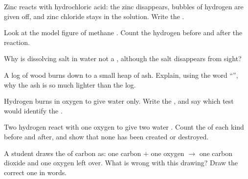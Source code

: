 \begin{exercise}[$\star\star$]\label{exo:g7:chemical-reactions:6}
Zinc reacts with hydrochloric acid: the zinc disappears, bubbles of
hydrogen are given off, and zinc chloride stays in the solution. Write
the .
\end{exercise}

\begin{exercise}[$\star\star$]\label{exo:g7:chemical-reactions:7}
Look at the model figure of methane . Count the hydrogen 
before and after the reaction.
\end{exercise}

\begin{exercise}[$\star\star$]\label{exo:g7:chemical-reactions:8}
Why is dissolving salt in water not a , although the
salt disappears from sight?
\end{exercise}

\begin{exercise}[$\star\star$]\label{exo:g7:chemical-reactions:9}
A log of wood burns down to a small heap of ash. Explain, using the word
``'', why the ash is so much lighter than the log.
\end{exercise}

\begin{exercise}[$\star\star$]\label{exo:g7:chemical-reactions:10}
Hydrogen burns in oxygen to give water only. Write the ,
and say which test would identify the .
\end{exercise}

\begin{exercise}[$\star\star\star$]\label{exo:g7:chemical-reactions:11}
Two hydrogen   react with one oxygen   to
give two water  . Count the  of each kind before
and after, and show that none has been created or destroyed.
\end{exercise}

\begin{exercise}[$\star\star\star$]\label{exo:g7:chemical-reactions:12}
A student draws the  of carbon as: one carbon  $+$ one oxygen
 $\longrightarrow$ one carbon dioxide  and one oxygen
 left over. What is wrong with this drawing? Draw the correct one in
words.
\end{exercise}


